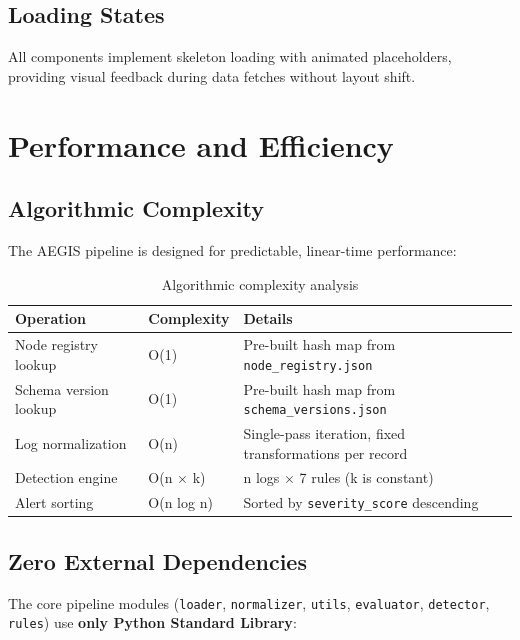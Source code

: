 \documentclass[12pt,a4paper]{article}
\begin{document}
\subsection{Loading States}

All components implement skeleton loading with animated placeholders, providing visual feedback during data fetches without layout shift.

\section{Performance and Efficiency}

\subsection{Algorithmic Complexity}

The AEGIS pipeline is designed for predictable, linear-time performance:

\begin{table}[H]
\centering
\begin{tabularx}{\linewidth}{l l X}
\toprule
\textbf{Operation} & \textbf{Complexity} & \textbf{Details} \\
\midrule
Node registry lookup & O(1) & Pre-built hash map from \texttt{node\_registry.json} \\
Schema version lookup & O(1) & Pre-built hash map from \texttt{schema\_versions.json} \\
Log normalization & O(n) & Single-pass iteration, fixed transformations per record \\
Detection engine & O(n $\times$ k) & n logs $\times$ 7 rules (k is constant) \\
Alert sorting & O(n log n) & Sorted by \texttt{severity\_score} descending \\
\bottomrule
\end{tabularx}
\caption{Algorithmic complexity analysis}
\end{table}

\subsection{Zero External Dependencies}

The core pipeline modules (\texttt{loader}, \texttt{normalizer}, \texttt{utils}, \texttt{evaluator}, \texttt{detector}, \texttt{rules}) use \textbf{only Python Standard Library}:
\end{document}
